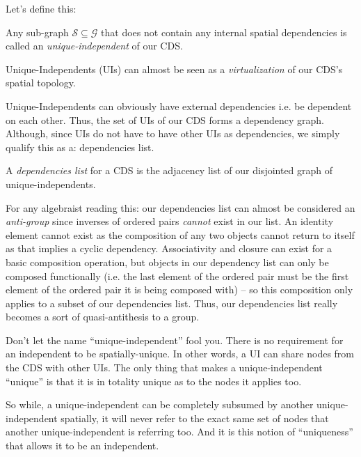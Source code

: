 Let's define this:

\begin{con-def}
	\label{independents}
	Any sub-graph $\mathcal{S} \subseteq \mathcal{G}$ that does not contain any internal spatial dependencies is called an \textit{unique-independent} of our CDS.
\end{con-def}

Unique-Independents (UIs) can almost be seen as a \textit{virtualization} of our CDS's spatial topology.

Unique-Independents can obviously have external dependencies i.e. be dependent on each other. Thus, the set of UIs of our CDS forms a dependency graph. Although, since UIs do not have to have other UIs as dependencies, we simply qualify this as a: dependencies list.

\begin{con-def}
	\label{dependency-list}
	A \textit{dependencies list} for a CDS is the adjacency list of our disjointed graph of unique-independents.
\end{con-def}

\if
For any algebraist reading this: our dependencies list can almost be considered an \textit{anti-group} since inverses of ordered pairs \textit{cannot} exist in our list. An identity element cannot exist as the composition of any two objects cannot return to itself as that implies a cyclic dependency. Associativity and closure can exist for a basic composition operation, but objects in our dependency list can only be composed functionally (i.e. the last element of the ordered pair must be the first element of the ordered pair it is being composed with) -- so this composition only applies to a subset of our dependencies list. Thus, our dependencies list really becomes a sort of quasi-antithesis to a group.
\fi

Don't let the name ``unique-independent'' fool you. There is no requirement for an independent to be spatially-unique. In other words, a UI can share nodes from the CDS with other UIs. The only thing that makes a unique-independent ``unique'' is that it is in totality unique as to the nodes it applies too. 

So while, a unique-independent can be completely subsumed by another unique-independent spatially, it will never refer to the exact same set of nodes that another unique-independent is referring too. And it is this notion of ``uniqueness'' that allows it to be an independent.

